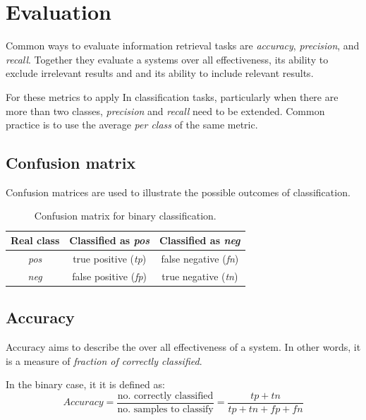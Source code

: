 \documentclass[a4paper,11pt]{kth-mag}
\begin{document}
\section{Evaluation}  %
\label{sec:precision_recall}
Common ways to evaluate information retrieval tasks are \emph{accuracy},
\emph{precision}, and \emph{recall}.
Together they evaluate a systems over all effectiveness,
its ability to exclude irrelevant results and 
and its ability to include relevant results.

For these metrics to apply In classification tasks, particularly when there are more
than two classes, \emph{precision} and \emph{recall} need to be extended. Common practice
is to use the average \emph{per class} of the same metric.


\subsection{Confusion matrix}
Confusion matrices are used to illustrate the possible outcomes of classification.

\begin{table}[h]
  \centering
  \begin{tabular}{| c | c | c |}

    \hline
    Real class & Classified as \emph{pos} & Classified as \emph{neg} \\ \hline
    \emph{pos} & true positive (\emph{tp}) & false negative (\emph{fn}) \\\hline
    \emph{neg} & false positive (\emph{fp}) & true negative (\emph{tn}) \\\hline
  \end{tabular}
  \caption{Confusion matrix for binary classification.}
  \label{todo}
\end{table}



\subsection{Accuracy}
Accuracy aims to describe the over all effectiveness of a system.
In other words, it is a measure of \emph{fraction of correctly classified}.

In the binary case, it it is defined as\cite{sokolova2009systematic}:
\begin{equation} \label{eq:accuracy}
  Accuracy = \frac{\text{no. correctly classified}}{\text{no. samples to classify}} =
  \frac{tp + tn}{tp+tn+fp+fn}
\end{equation}
\end{document}
